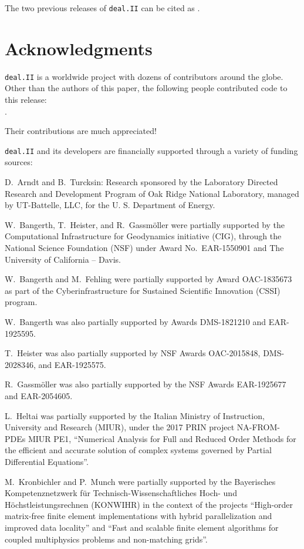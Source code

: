 \documentclass{ansarticle-preprint}
\newcommand{\specialword}[1]{\texttt{#1}}
\newcommand{\dealii}{{\specialword{deal.II}}\xspace}
\begin{document}
The two previous releases of \dealii can be cited as
\cite{dealII92,dealII93}.


\section{Acknowledgments}

\dealii is a worldwide project with dozens of contributors around the
globe. Other than the authors of this paper, the following people
contributed code to this release:\\
%
%

.


Their contributions are much appreciated!


\bigskip

\dealii and its developers are financially supported through a
variety of funding sources:


D.~Arndt and B.~Turcksin: Research sponsored by the Laboratory Directed Research and
Development Program of Oak Ridge National Laboratory, managed by UT-Battelle,
LLC, for the U. S. Department of Energy.

W.~Bangerth, T.~Heister, and R.~Gassm{\"o}ller were partially
supported by the Computational Infrastructure for Geodynamics initiative
(CIG), through the National Science Foundation (NSF) under Award
No.~EAR-1550901 and The University of California -- Davis.

W.~Bangerth and M.~Fehling were partially supported by Award OAC-1835673
as part of the Cyberinfrastructure for Sustained Scientific Innovation (CSSI)
program.

W.~Bangerth was also partially supported by Awards DMS-1821210 and EAR-1925595.

T.~Heister was also partially supported by NSF
Awards OAC-2015848, DMS-2028346, and
EAR-1925575.

R.~Gassm{\"o}ller was also partially supported by the NSF Awards
EAR-1925677 and EAR-2054605.

L.~Heltai was partially supported by the Italian Ministry of Instruction,
University and Research (MIUR), under the 2017 PRIN project NA-FROM-PDEs MIUR
PE1, ``Numerical Analysis for Full and Reduced Order Methods for the efficient
and accurate solution of complex systems governed by Partial Differential
Equations''.

M.~Kronbichler and P.~Munch were partially supported by the
Bayerisches Kompetenznetzwerk
f\"ur Technisch-Wissen\-schaft\-li\-ches Hoch- und H\"ochstleistungsrechnen
(KONWIHR) in the context of the projects
``High-order matrix-free finite element implementations with
hybrid parallelization and improved data locality'' and ``Fast and scalable finite element algorithms for coupled multiphysics problems and non-matching grids''.
\end{document}
